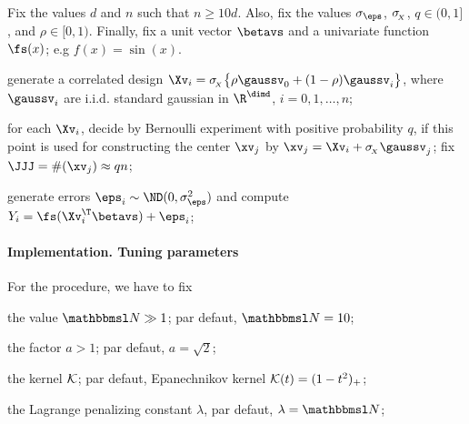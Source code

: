Fix the values \( d \) and \( n \) such that \( n \geq 10 d \).
Also, fix the values \( \sigma_{\eps} \), \( \sigma_{\!_{X}} \), \( q \in (0,1] \), and \( \rho \in [0,1) \).
Finally, fix a unit vector \( \betavs \) and a univariate function \( \fs(x) \); e.g \( f(x) = \sin(x) \).
\begin{mylist}

\item 
generate a correlated design \( \Xv_{i} = \sigmaX \bigl\{ \rho \gaussv_{0} + (1 - \rho) \gaussv_{i} \bigr\} \),
where \( \gaussv_{i} \) are i.i.d. standard gaussian in \( \R^{\dimd} \), \( i=0,1,\ldots,n \);
\item 
for each \( \Xv_{i} \), decide by Bernoulli experiment with positive probability \( q \), if this point is used for 
constructing the center \( \xv_{j} \) by \( \xv_{j} = \Xv_{i} + \sigmaX \gaussv_{j} \);
fix \( \JJJ = \#(\xv_{j}) \approx q n \);
\item 
generate errors \( \eps_{i} \sim \ND(0,\sigma_{\eps}^{2}) \) and compute \( Y_{i} = \fs(\Xv_{i}^{\T} \betavs) + \eps_{i} \);
\end{mylist}

\paragraph{Implementation. Tuning parameters}
For the procedure, we have to fix
\begin{mylist}

\item 
the value \( \nmin \gg 1 \); par defaut, \( \nmin = 10 \);
\item 
the factor \( a > 1 \); par defaut, \( a = \sqrt{2} \);
\item 
the kernel \( \mathcal{K} \); par defaut, Epanechnikov kernel \( \mathcal{K}(t) = (1-t^{2})_{+} \);
\item 
the Lagrange penalizing constant \( \lambda \), par defaut, \( \lambda = \nmin \);
\end{mylist}

